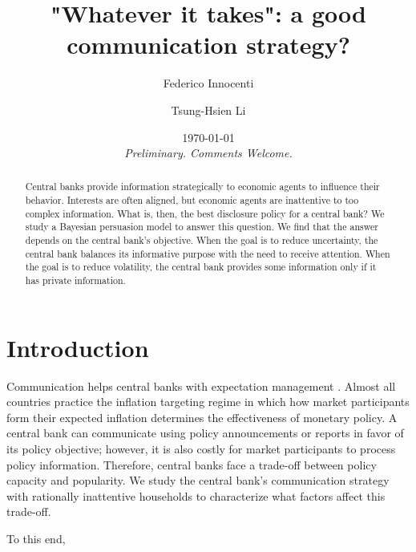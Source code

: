 \documentclass[12pt,a4paper]{article}
\title{"Whatever it takes": a good communication strategy?}
\author{Federico Innocenti \and Tsung-Hsien Li}
\date{\today \\ \medskip
\emph{Preliminary. Comments Welcome.}}
\begin{document}
\setlength{\parskip}{2mm}

\maketitle

\begin{abstract}
Central banks provide information strategically to economic agents to influence their behavior. Interests are often aligned, but economic agents are inattentive to too complex information. What is, then, the best disclosure policy for a central bank? We study a Bayesian persuasion model to answer this question. We find that the answer depends on the central bank's objective. When the goal is to reduce uncertainty, the central bank balances its informative purpose with the need to receive attention. When the goal is to reduce volatility, the central bank provides some information only if it has private information. 
\end{abstract}

\newpage

\section{Introduction}

Communication helps central banks with expectation management \citep{Casiraghi2022}. Almost all countries practice the inflation targeting regime in which how market participants form their expected inflation determines the effectiveness of monetary policy. A central bank can communicate using policy announcements or reports in favor of its policy objective; however, it is also costly for market participants to process policy information. Therefore, central banks face a trade-off between policy capacity and popularity. We study the central bank's communication strategy with rationally inattentive households to characterize what factors affect this trade-off.

To this end, 
\end{document}
